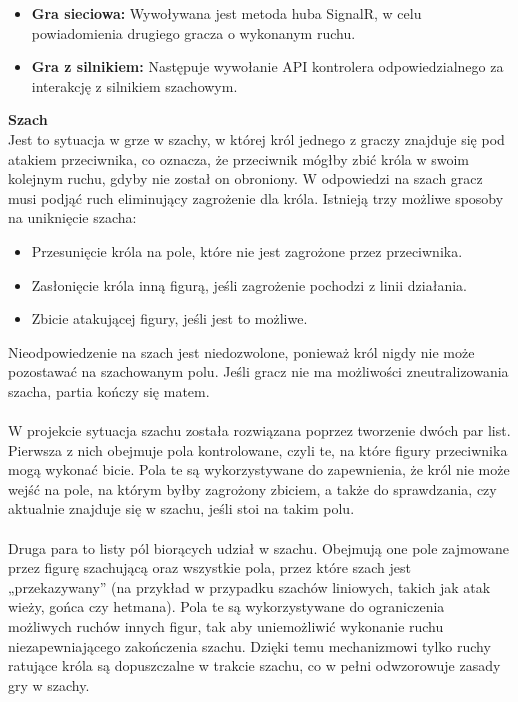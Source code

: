 \documentclass[12pt,a4paper]{article}
\begin{document}
\begin{itemize}
    \item \textbf{Gra sieciowa:} Wywoływana jest metoda huba SignalR, w celu powiadomienia drugiego gracza o wykonanym ruchu.
    \item \textbf{Gra z silnikiem:} Następuje wywołanie API kontrolera odpowiedzialnego za interakcję z silnikiem szachowym.
\end{itemize}

\newpage

\noindent \textbf{Szach}\\
Jest to sytuacja w grze w szachy, w której król jednego z graczy znajduje się pod atakiem przeciwnika, co oznacza, że przeciwnik mógłby zbić króla w swoim kolejnym ruchu, gdyby nie został on obroniony. W odpowiedzi na szach gracz musi podjąć ruch eliminujący zagrożenie dla króla. Istnieją trzy możliwe sposoby na uniknięcie szacha:

\begin{itemize}
    \item Przesunięcie króla na pole, które nie jest zagrożone przez przeciwnika.
    \item Zasłonięcie króla inną figurą, jeśli zagrożenie pochodzi z linii działania.
    \item Zbicie atakującej figury, jeśli jest to możliwe.
\end{itemize}

\noindent
Nieodpowiedzenie na szach jest niedozwolone, ponieważ król nigdy nie może pozostawać na szachowanym polu. Jeśli gracz nie ma możliwości zneutralizowania szacha, partia kończy się matem.
\\\\
W projekcie sytuacja szachu została rozwiązana poprzez tworzenie dwóch par list. Pierwsza z nich obejmuje pola kontrolowane, czyli te, na które figury przeciwnika mogą wykonać bicie. Pola te są wykorzystywane do zapewnienia, że król nie może wejść na pole, na którym byłby zagrożony zbiciem, a także do sprawdzania, czy aktualnie znajduje się w szachu, jeśli stoi na takim polu.
\\\\
Druga para to listy pól biorących udział w szachu. Obejmują one pole zajmowane przez figurę szachującą oraz wszystkie pola, przez które szach jest „przekazywany” (na przykład w przypadku szachów liniowych, takich jak atak wieży, gońca czy hetmana). Pola te są wykorzystywane do ograniczenia możliwych ruchów innych figur, tak aby uniemożliwić wykonanie ruchu niezapewniającego zakończenia szachu. Dzięki temu mechanizmowi tylko ruchy ratujące króla są dopuszczalne w trakcie szachu, co w pełni odwzorowuje zasady gry w szachy.
\end{document}

